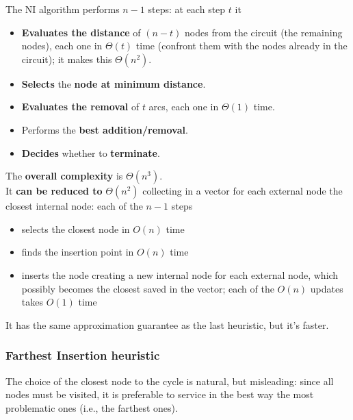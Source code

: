 \newpage

The NI algorithm performs $n - 1$ steps: at each step $t$ it
\begin{itemize}
	\item \textbf{Evaluates the distance} of $(n - t)$ nodes from the circuit (the remaining nodes), each one in $\Theta (t)$ time (confront them with the nodes already in the circuit); it makes this $\Theta (n^2)$.\\
	
	\item \textbf{Selects} the \textbf{node at minimum distance}.\\
	
	\item \textbf{Evaluates the removal} of $t$ arcs, each one in $\Theta (1)$ time.\\
	
	\item Performs the \textbf{best addition/removal}.\\
	
	\item \textbf{Decides} whether to \textbf{terminate}.\\
\end{itemize}

The \textbf{overall complexity} is $\Theta (n^3)$.\\

It \textbf{can be reduced to} $\Theta (n^2)$ collecting in a vector for each external node the closest internal node: each of the $n - 1$ steps
\begin{itemize}
	\item selects the closest node in $O (n)$ time
	\item finds the insertion point in $O (n)$ time
	\item inserts the node creating a new internal node for each external node, which possibly becomes the closest saved in the vector; each of the $O (n)$ updates takes $O (1)$ time
\end{itemize}

It has the same approximation guarantee as the last heuristic, but it's faster.\\

\newpage

\subsubsection{Farthest Insertion heuristic}
The choice of the closest node to the cycle is natural, but misleading: since all nodes must be visited, it is preferable to service in the best way the most problematic ones (i.e., the farthest ones).\\

